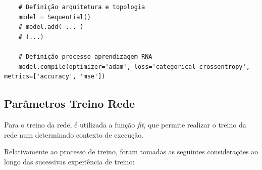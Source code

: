 \begin{verbatim} 
    # Definição arquitetura e topologia
    model = Sequential()
    # model.add( ... )
    # (...)
    
    # Definição processo aprendizagem RNA
    model.compile(optimizer='adam', loss='categorical_crossentropy', metrics=['accuracy', 'mse'])
\end{verbatim}

\subsection{Parâmetros Treino Rede}
\label{sec:ParametrostreinoRede}

Para o treino da rede, é utilizada a função \textit{fit}, que permite realizar o treino da rede num determinado contexto de execução.

Relativamente ao processo de treino, foram tomadas as seguintes considerações ao longo das sucessivas experiência de treino: 

